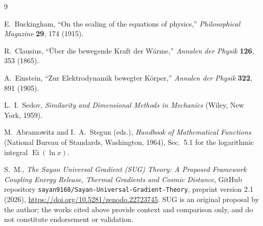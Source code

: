 \documentclass[11pt,a4paper]{article}
\newcommand{\Ei}{\operatorname{Ei}}
\newcommand{\code}[1]{\texttt{#1}}
\begin{document}
\begin{thebibliography}{9}

E.~Buckingham, ``On the scaling of the equations of physics,''
\emph{Philosophical Magazine} \textbf{29}, 174 (1915).

R.~Clausius, ``\"Uber die bewegende Kraft der W\"arme,''
\emph{Annalen der Physik} \textbf{126}, 353 (1865).

A.~Einstein, ``Zur Elektrodynamik bewegter K\"orper,''
\emph{Annalen der Physik} \textbf{322}, 891 (1905).

L.~I.~Sedov, \emph{Similarity and Dimensional Methods in Mechanics}
(Wiley, New York, 1959).

M.~Abramowitz and I.~A.~Stegun (eds.),
\emph{Handbook of Mathematical Functions} (National Bureau of Standards,
Washington, 1964), Sec.~5.1 for the logarithmic integral $\Ei(\ln x)$.

S.~M., \emph{The Sayan Universal Gradient (SUG) Theory: A Proposed Framework
Coupling Energy Release, Thermal Gradients and Cosmic Distance}, GitHub
repository \code{sayan9168/Sayan-Universal-Gradient-Theory}, preprint version
2.1 (2026), \url{https://doi.org/10.5281/zenodo.22723745}.
SUG is an original proposal by the author; the works cited above provide
context and comparison only, and do not constitute endorsement or validation.

\end{thebibliography}
\end{document}
